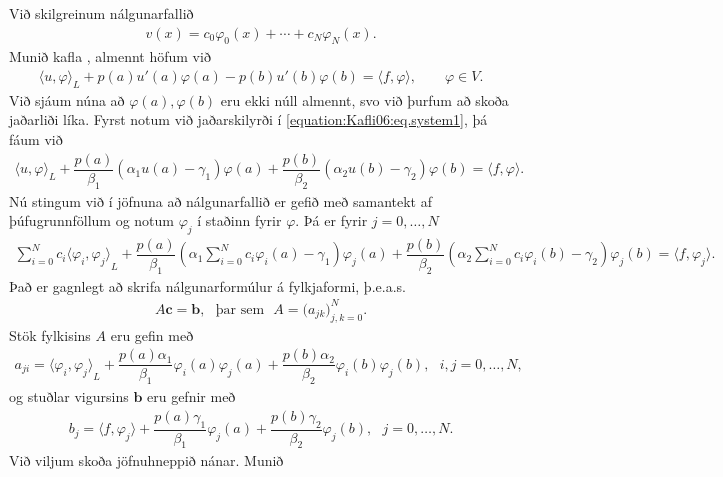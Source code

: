 \documentclass[a4paper,10pt,icelandic]{sphinxmanual}
\begin{document}
Við skilgreinum nálgunarfallið
\begin{equation*}
\begin{split}v(x)=c_0\varphi_0(x)+\cdots+c_N\varphi_N(x).\end{split}
\end{equation*}
Munið kafla {\hyperref[\detokenize{Kafli06:ch-6-1-2}]{}}, almennt höfum við
\begin{equation}\label{equation:Kafli06:eq.form1dgenv1}
\begin{split}{{\langle u,\varphi\rangle}}_L + p(a)u'(a)\varphi(a)-p(b)u'(b)\varphi(b)
= {{\langle f,\varphi\rangle}}, \qquad \varphi\in V.\end{split}
\end{equation}
Við sjáum núna að \(\varphi(a), \varphi(b)\) eru ekki núll almennt, svo við þurfum að skoða jaðarliði líka.
Fyrst notum við jaðarskilyrði í \eqref{equation:Kafli06:eq.system1}, þá fáum við
\begin{equation*}
\begin{split}{{\langle u,\varphi\rangle}}_L  +
\dfrac {p(a)}{\beta_1}(\alpha_1u(a)-\gamma_1)\varphi(a)
+\dfrac{p(b)}{\beta_2}(\alpha_2u(b)-\gamma_2)\varphi(b)
={{\langle f,\varphi\rangle}}.\end{split}
\end{equation*}
Nú stingum við í jöfnuna að nálgunarfallið er gefið með samantekt af þúfugrunnföllum og notum \(\varphi_j\) í staðinn fyrir \(\varphi\). Þá er fyrir \(j=0, \dots, N\)
\begin{equation*}
\begin{split}\sum_{i=0}^N c_i{{\langle \varphi_i ,\varphi_j\rangle}}_L  +
\dfrac {p(a)}{\beta_1}(\alpha_1 \sum_{i=0}^N c_i \varphi_i(a)-\gamma_1)\varphi_j(a)
+\dfrac{p(b)}{\beta_2}(\alpha_2\sum_{i=0}^N c_i \varphi_i(b)-\gamma_2)\varphi_j(b)
={{\langle f,\varphi_j\rangle}}.\end{split}
\end{equation*}
Það er gagnlegt að skrifa nálgunarformúlur á fylkjaformi, þ.e.a.s.
\begin{equation*}
\begin{split}A{\mathbf c}={\mathbf b}, ~~~\text{þar sem}~~~ A=\big(a_{jk}\big)_{j,k=0}^N.\end{split}
\end{equation*}
Stök fylkisins \(A\) eru gefin með
\begin{equation*}
\begin{split}a_{ji}= {{\langle \varphi_i ,\varphi_j\rangle}}_L+ \dfrac {p(a)\alpha_1}{\beta_1}\varphi_i(a)\varphi_j(a)+\dfrac {p(b)\alpha_2}{\beta_2}\varphi_i(b)\varphi_j(b),~~~i,j=0, \dots, N,\end{split}
\end{equation*}
og stuðlar vigursins \(\mathbf b\) eru gefnir með
\begin{equation*}
\begin{split}b_j
={{\langle f,\varphi_j\rangle}}+\dfrac {p(a)\gamma_1}{\beta_1}\varphi_j(a)
+\dfrac{p(b)\gamma_2}{\beta_2}\varphi_j(b), ~~~j=0, \dots, N.\end{split}
\end{equation*}
Við viljum skoða jöfnuhneppið nánar. Munið
\end{document}
